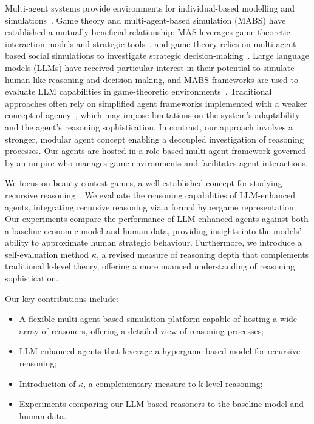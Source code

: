 \documentclass[runningheads]{llncs}
\begin{document}
Multi-agent systems provide environments for individual-based modelling and simulations~\cite{michel2018multi}. Game theory and multi-agent-based simulation (MABS) have established a mutually beneficial relationship: MAS leverages game-theoretic interaction models and strategic tools~\cite{parsons2002game}, and game theory relies on multi-agent-based social simulations to investigate strategic decision-making~\cite{sun2006cognition}. Large language models (LLMs) have received particular interest in their potential to simulate human-like reasoning and decision-making, and MABS frameworks are used to evaluate LLM capabilities in game-theoretic environments~\cite{guo2024economicsarenalargelanguage}. Traditional approaches often rely on simplified agent frameworks implemented with a weaker concept of agency~\cite{Wooldridge_Jennings_1995}, which may impose limitations on the system's adaptability and the agent's reasoning sophistication. In contrast, our approach involves a stronger, modular agent concept enabling a decoupled investigation of reasoning processes. Our agents are hosted in a role-based multi-agent framework governed by an umpire who manages game environments and facilitates agent interactions.

We focus on beauty contest games, a well-established concept for studying recursive reasoning~\cite{camerer2004cognitive}. We evaluate the reasoning capabilities of LLM-enhanced agents, integrating recursive reasoning via a formal hypergame representation. Our experiments compare the performance of LLM-enhanced agents against both a baseline economic model and human data, providing insights into the models' ability to approximate human strategic behaviour. Furthermore, we introduce a self-evaluation method $\kappa$, a revised measure of reasoning depth that complements traditional k-level theory, offering a more nuanced understanding of reasoning sophistication.

Our key contributions include:
\begin{itemize}
    \item A flexible multi-agent-based simulation platform capable of hosting a wide array of reasoners, offering a detailed view of reasoning processes;
    \item LLM-enhanced agents that leverage a hypergame-based model for recursive reasoning;
    \item Introduction of $\kappa$, a complementary measure to k-level reasoning;
    \item Experiments comparing our LLM-based reasoners to the baseline model and human data.
\end{itemize}
\end{document}
